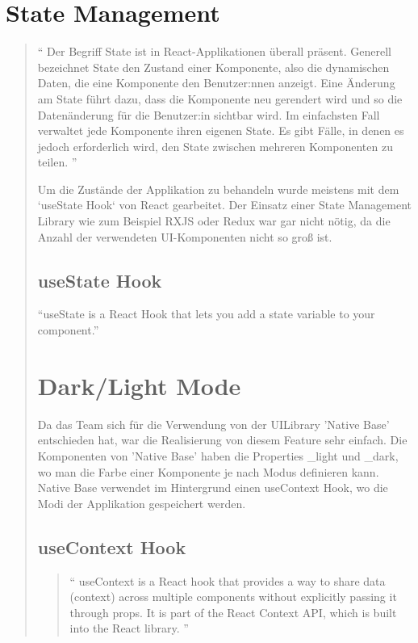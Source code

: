 \section{State Management}
\begin{quotation}
  ``
  Der Begriff State ist in React-Applikationen überall präsent. Generell
  bezeichnet State den Zustand einer Komponente,
  also die dynamischen Daten, die eine Komponente den Benutzer:nnen anzeigt.
  Eine Änderung am State führt dazu, dass die Komponente neu gerendert wird
  und so die Datenänderung für die Benutzer:in sichtbar wird.
  Im einfachsten Fall verwaltet jede Komponente ihren eigenen State.
  Es gibt Fälle, in denen es jedoch erforderlich wird,
  den State zwischen mehreren Komponenten zu teilen.
  ''
  \cite{state-management}

  Um die Zustände der Applikation zu behandeln wurde meistens mit dem `useState Hook` von React gearbeitet.
  Der Einsatz einer State Management Library wie zum Beispiel RXJS oder Redux war gar nicht nötig, da die Anzahl der verwendeten UI-Komponenten nicht so groß ist.

  \subsection{useState Hook}
  ``useState is a React Hook that lets you add a state variable to your component.'' \cite{useState}


  \section{Dark/Light Mode}
  Da das Team sich für die Verwendung von der UI\-Library 'Native Base' entschieden hat, war die Realisierung von diesem Feature sehr einfach.
  Die Komponenten von 'Native Base' haben die Properties \_light und \_dark, wo man die Farbe einer Komponente je nach Modus definieren kann.
  Native Base verwendet im Hintergrund einen useContext Hook, wo die Modi der Applikation gespeichert werden.
  \subsection{useContext Hook}
  \begin{quotation}
    ``
    useContext is a React hook that provides a way to share data (context)
    across multiple components without explicitly passing it through props.
    It is part of the React Context API, which is built into the React library.
    '' \cite{useContext}

  \end{quotation}




\end{quotation}


